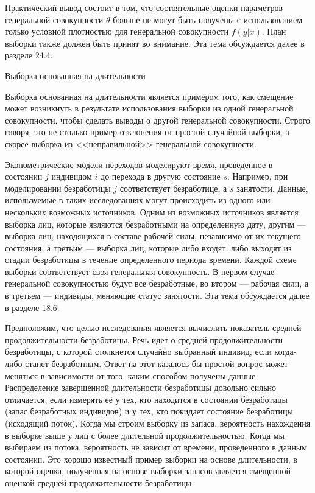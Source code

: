 Практический вывод состоит в том, что состоятельные оценки параметров генеральной совокупности $\theta$ больше не могут быть получены  с использованием только условной плотностью для генеральной совокупности $f(y|x)$. План выборки также должен быть принят во внимание. Эта тема обсуждается далее в разделе 24.4.


\begin{center}
Выборка основанная на длительности
\end{center}

Выборка основанная на длительности является примером того, как смещение может возникнуть в результате использования выборки из одной генеральной совокупности, чтобы сделать выводы о другой генеральной совокупности. Строго говоря, это не столько пример отклонения от простой случайной выборки, а скорее выборка  из <<неправильной>> генеральной совокупности.


Эконометрические  модели переходов моделируют время, проведенное в состоянии $j$ индивидом $i$ до перехода в другую состояние $s$. Например, при моделировании безработицы $j$ соответствует безработице, а $s$ занятости. Данные, используемые в таких исследованиях могут происходить из одного или нескольких возможных источников. 
Одним из возможных источников является выборка лиц, которые являются безработными на определенную дату, другим --- выборка лиц, находящихся в составе рабочей силы, независимо от их текущего состояния, а третьим --- выборка лиц, которые либо входят, либо выходят из стадии безработицы в течение определенного периода времени. Каждой схеме выборки соответствует своя генеральная совокупность. 
В первом случае генеральной совокупностью будут все безработные, во втором --- рабочая сили, а в третьем --- индивиды, меняющие статус занятости. Эта тема обсуждается далее в разделе 18.6.


Предположим, что целью исследования является вычислить показатель средней продолжительности безработицы. Речь идет о средней продолжительности безработицы, с которой столкнется случайно выбранный индивид, если когда-либо станет безработным. Ответ на этот казалось бы простой вопрос  может меняться в зависимости от того, каким способом получены данные. Распределение  завершенной длительности безработицы довольно сильно отличается, если измерять её у тех, кто находится в состоянии безработицы (запас безработных индивидов) и у тех, кто покидает состояние безработицы (исходящий поток). Когда мы строим выборку из запаса, вероятность нахождения в выборке выше у лиц с более длительной продолжительностью. Когда мы выбираем из потока, вероятность не зависит от времени, проведенного в данным состоянии. Это хорошо известный пример выборки на основе длительности, в которой оценка, полученная на основе выборки запасов является смещенной оценкой средней продолжительности безработицы.

